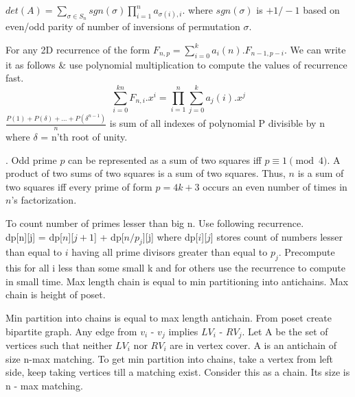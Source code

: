  $det(A) = \sum_{\sigma \in S_{n}} sgn(\sigma) \prod_{i=1}^{n}a_{\sigma(i),i}$. where $sgn(\sigma)$ is $+1/-1$ based on even/odd parity of number of inversions of permutation $\sigma$.
 
 For any 2D recurrence of the form $F_{n,p} = \sum_{i=0}^{k}a_{i}(n).F_{n-1,p-i}$. We can write it as follows & use polynomial multiplication to compute the values of recurrence fast.
\[
\sum_{i=0}^{kn}F_{n,i}.x^{i} = \prod_{i=1}^{n} \sum_{j=0}^{k}a_{j}(i).x^{j}
\]
$\frac{P(1)+P(\delta)+...+P(\delta^{n-1})}{n}$ is sum of all indexes of polynomial P divisible by n where $\delta$ = n'th root of unity.
 
.  Odd prime $p$ can be represented
as a sum of two squares iff $p \equiv 1 {\pmod 4}$.
A product of two sums of two squares is a sum of two squares.
Thus, $n$ is a sum of two squares iff every prime of
form $p=4k+3$ occurs an even number of times in $n$'s factorization.
 
   To count number of primes lesser than big n. Use following recurrence. \\ dp[n][j] = dp[$n$][$j+1$] + dp[$n/p_{j}$][j]   where dp[$i$][$j$] stores count of numbers lesser than equal to $i$ having all prime divisors greater than equal to $p_{j}$. Precompute this for all i less than some small k and for others use the recurrence to compute in small time.
 Max length chain is equal to min partitioning into antichains. Max chain is height of poset.
 
 Min partition into chains is equal to max length antichain. From poset create bipartite graph. Any edge from $v_{i}$ - $v_{j}$ implies  $LV_{i}$ - $RV_{j}$. Let A be the set of vertices such that neither $LV_{i}$ nor $RV_{i}$ are in vertex cover. A is an antichain of size n-max matching. To get min partition into chains, take a vertex from left side, keep taking vertices till a matching exist. Consider this as a chain. Its size is n - max matching.
 
